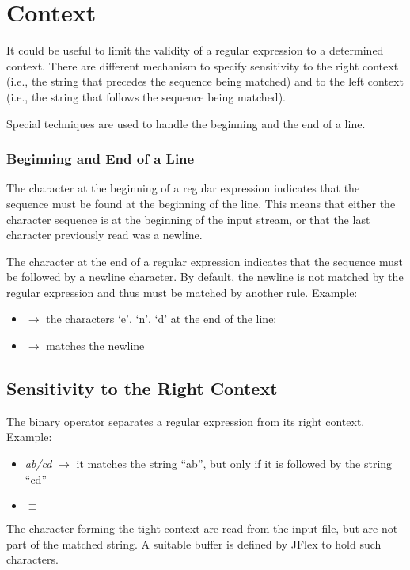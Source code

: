 \section{Context}
It could be useful to limit the validity of a regular expression to a determined context.
There are different mechanism to specify sensitivity to the right context (i.e., the string that precedes the sequence being matched) and to the left context (i.e., the string that follows the sequence being matched).

Special techniques are used to handle the beginning and the end of a line.

\subsubsection{Beginning and End of a Line}
The character \code{^} at the beginning of a regular expression indicates that the sequence must be found at the beginning of the line. This means that either the character sequence is at the beginning of the input stream, or that the last character previously read was a newline.

The character \code{\$} at the end of a regular expression indicates that the sequence must be followed by a newline character.
By default, the newline is not matched by the regular expression and thus must be matched by another rule.
Example:
\begin{itemize}
	\item {} $\to$ the characters `e', `n', `d' at the end of the line;
	\item \code{\\r\|\\n\|\\r\\n} $\to$ matches the newline
\end{itemize}

\subsection{Sensitivity to the Right Context}
The binary operator \code{\/} separates a regular expression from its right context.
Example:
\begin{itemize}
	\item[] \emph{ab/cd} $\to$ it matches the string ``ab'', but only if it is followed by the string ``cd''
	\item[]  $\equiv$ 
\end{itemize}
The character forming the tight context are read from the input file, but are not part of the matched string.
A suitable buffer is defined by JFlex to hold such characters.

